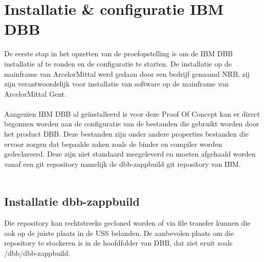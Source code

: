 \section{Installatie \& configuratie IBM DBB}
\label{sec:installdbb}
De eerste stap in het opzetten van de proefopstelling is om de IBM DBB installatie af te ronden en de configuratie te starten. De installatie op de mainframe van ArcelorMittal werd gedaan door een bedrijf genaamd NRB, zij zijn verantwoordelijk voor installatie van software op de mainframe van ArcelorMittal Gent. 
\\ \\
Aangezien IBM DBB al geïnstalleerd is voor deze Proof Of Concept kan er direct begonnen worden aan de configuratie van de bestanden die gebruikt worden door het product DBB. Deze bestanden zijn onder andere properties bestanden die ervoor zorgen dat bepaalde zaken zoals de binder en compiler worden gedeclareerd. Deze zijn niet standaard meegeleverd en moeten afgehaald worden vanaf een git repository namelijk de dbb-zappbuild git repository van IBM. 
\\ \\
\subsection{Installatie dbb-zappbuild}
Die repository kan rechtstreeks gecloned worden of via file transfer kunnen die ook op de juiste plaats in de USS belanden. De aanbevolen plaats om die repository te stockeren is in de hoofdfolder van DBB, dat ziet eruit zoals /dbb/dbb-zappbuild.
\\ \\
